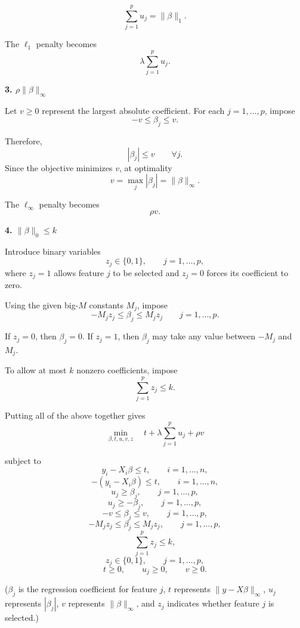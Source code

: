 \documentclass{article}
\begin{document}
\[
\sum_{j=1}^p u_j=\|\beta\|_1.
\]

The $\ell_1$ penalty becomes
\[
\lambda\sum_{j=1}^p u_j.
\]

\medskip
\textbf{3. $\rho\|\beta\|_\infty$}

Let $v\geq 0$ represent the largest
absolute coefficient. For each $j=1,\ldots,p$, impose
\[
-v\leq\beta_j\leq v.
\]

Therefore,
\[
|\beta_j|\leq v
\qquad \forall j.
\]
Since the objective minimizes $v$, at optimality
\[
v=\max_j|\beta_j|
=
\|\beta\|_\infty.
\]

The $\ell_\infty$ penalty becomes
\[
\rho v.
\]

\medskip
\textbf{4. $\|\beta\|_0\leq k$}

Introduce binary variables
\[
z_j\in\{0,1\},
\qquad j=1,\ldots,p,
\]
where $z_j=1$ allows feature $j$ to be selected and $z_j=0$ forces its
coefficient to zero.

Using the given big-$M$ constants $M_j$, impose
\[
-M_jz_j\leq\beta_j\leq M_jz_j
\qquad j=1,\ldots,p.
\]

If $z_j=0$, then $\beta_j=0$. If $z_j=1$, then $\beta_j$ may take any
value between $-M_j$ and $M_j$.

To allow at most $k$ nonzero coefficients, impose
\[
\sum_{j=1}^p z_j\leq k.
\]

\medskip

Putting all of the above together gives
\[
\boxed{
\min_{\beta,t,u,v,z}
\quad
t
+
\lambda\sum_{j=1}^p u_j
+
\rho v}
\]

subject to
\[
y_i-X_i\beta\leq t,
\qquad i=1,\ldots,n,
\]
\[
-(y_i-X_i\beta)\leq t,
\qquad i=1,\ldots,n,
\]
\[
u_j\geq\beta_j,
\qquad j=1,\ldots,p,
\]
\[
u_j\geq-\beta_j,
\qquad j=1,\ldots,p,
\]
\[
-v\leq\beta_j\leq v,
\qquad j=1,\ldots,p,
\]
\[
-M_jz_j\leq\beta_j\leq M_jz_j,
\qquad j=1,\ldots,p,
\]
\[
\sum_{j=1}^p z_j\leq k,
\]
\[
z_j\in\{0,1\},
\qquad j=1,\ldots,p,
\]
\[
t\geq0,\qquad
u_j\geq0,\qquad
v\geq0.
\]

($\beta_j$ is the regression coefficient for feature $j$,
$t$ represents $\|y-X\beta\|_\infty$, $u_j$ represents
$|\beta_j|$, $v$ represents $\|\beta\|_\infty$, and $z_j$ indicates
whether feature $j$ is selected.)
\end{document}

